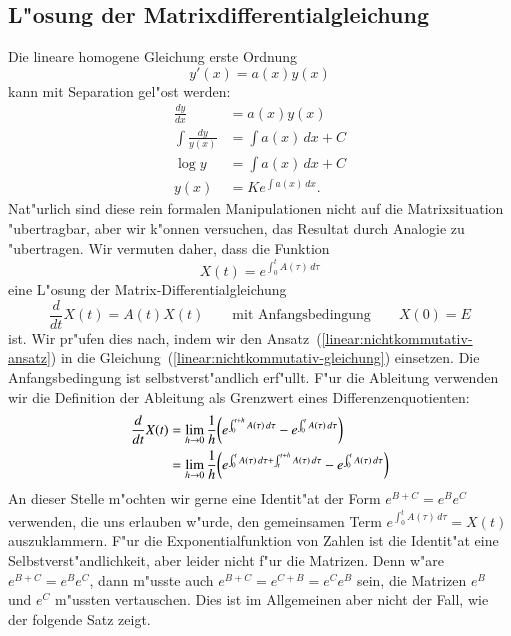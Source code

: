 \subsection{L"osung der Matrixdifferentialgleichung}
Die lineare homogene Gleichung erste Ordnung
\[
y'(x)=a(x)y(x)
\]
kann mit Separation gel"ost werden:
\begin{align*}
\frac{dy}{dx}&=a(x)y(x)
\\
\int\frac{dy}{y(x)}&=\int a(x)\,dx+C
\\
\log y &= \int a(x)\,dx + C
\\
y(x)&=Ke^{\int a(x)\,dx}.
\end{align*}
Nat"urlich sind diese rein formalen Manipulationen nicht auf die
Matrixsituation "ubertragbar, aber wir k"onnen versuchen, das Resultat
durch Analogie zu "ubertragen.
Wir vermuten daher, dass die Funktion
\begin{equation}
X(t)=e^{\int_0^tA(\tau)\,d\tau}
\label{linear:nichtkommutativ-ansatz}
\end{equation}
eine L"osung der Matrix-Differentialgleichung
\begin{equation}
\frac{d}{dt}X(t)=A(t)X(t)\qquad\text{mit Anfangsbedingung}\qquad X(0)=E
\label{linear:nichtkommutativ-gleichung}
\end{equation}
ist.
Wir pr"ufen dies nach, indem wir den
Ansatz~(\ref{linear:nichtkommutativ-ansatz})
in die Gleichung~(\ref{linear:nichtkommutativ-gleichung}) einsetzen.
Die Anfangsbedingung ist selbstverst"andlich erf"ullt.
F"ur die Ableitung verwenden wir die Definition der Ableitung als
Grenzwert eines Differenzenquotienten:
\begin{align}
\frac{d}{dt}X(t)
&=
\lim_{h\to 0}\frac1h\biggl(e^{\int_0^{t+h}A(\tau)\,d\tau}
-
e^{\int_0^tA(\tau)\,d\tau}\biggr)
\notag
\\
&=
\lim_{h\to 0}\frac1h\biggl(
e^{\int_0^tA(\tau)\,d\tau
+
\int_t^{t+h}A(\tau)\,d\tau}
-
e^{\int_0^tA(\tau)\,d\tau}\biggr)
\label{linear:nichtkommutativ-diffquot}
\end{align}
An dieser Stelle m"ochten wir gerne eine Identit"at der Form $e^{B+C}=e^Be^C$
verwenden, die uns erlauben w"urde, den gemeinsamen Term
$e^{\int_0^tA(\tau)\,d\tau}=X(t)$ auszuklammern.
F"ur die Exponentialfunktion von Zahlen ist die Identit"at eine
Selbstverst"andlichkeit, aber leider nicht f"ur die Matrizen.
Denn w"are $e^{B+C}=e^Be^C$, dann m"usste auch $e^{B+C}=e^{C+B}=e^Ce^B$
sein, die Matrizen $e^B$ und $e^C$ m"ussten vertauschen.
Dies ist im Allgemeinen aber nicht der Fall, wie der folgende
Satz zeigt.


